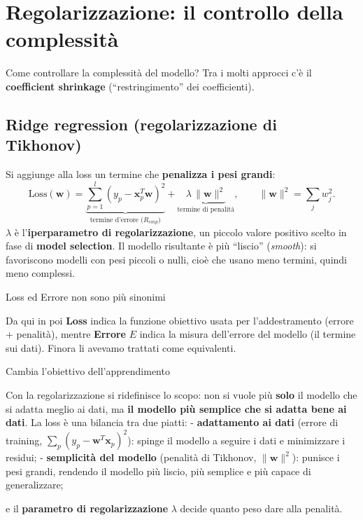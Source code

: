 \section{Regolarizzazione: il controllo della
complessità}\label{regolarizzazione-il-controllo-della-complessituxe0}

Come controllare la complessità del modello? Tra i molti approcci c'è il
\textbf{coefficient shrinkage} (``restringimento'' dei coefficienti).

\subsection{Ridge regression (regolarizzazione di
Tikhonov)}\label{ridge-regression-regolarizzazione-di-tikhonov}

Si aggiunge alla loss un termine che \textbf{penalizza i pesi grandi}:
\[
\text{Loss}(\mathbf{w}) = \underbrace{\sum_{p=1}^{l}(y_p - \mathbf{x}_p^T\mathbf{w})^2}_{\text{termine d'errore (} R_{emp}\text{)}} + \underbrace{\lambda\,\|\mathbf{w}\|^2}_{\text{termine di penalità}}, \qquad \|\mathbf{w}\|^2 = \sum_j w_j^2.
\] \(\lambda\) è l'\textbf{iperparametro di regolarizzazione}, un
piccolo valore positivo scelto in fase di \textbf{model selection}. Il
modello risultante è più ``liscio'' (\emph{smooth}): si favoriscono
modelli con pesi piccoli o nulli, cioè che usano meno termini, quindi
meno complessi.

\begin{boxnote}{Loss ed Errore non sono più sinonimi}

Da qui in poi \textbf{Loss} indica la funzione obiettivo usata per
l'addestramento (errore + penalità), mentre \textbf{Errore} \(E\) indica
la misura dell'errore del modello (il termine sui dati). Finora li
avevamo trattati come equivalenti.

\end{boxnote}

\begin{boxtip}{Cambia l'obiettivo dell'apprendimento}

Con la regolarizzazione si ridefinisce lo scopo: non si vuole più
\textbf{solo} il modello che si adatta meglio ai dati, ma \textbf{il
modello più semplice che si adatta bene ai dati}. La loss è una bilancia
tra due piatti: - \textbf{adattamento ai dati} (errore di training,
\(\sum_p(y_p - \mathbf{w}^T\mathbf{x}_p)^2\)): spinge il modello a
seguire i dati e minimizzare i residui; - \textbf{semplicità del
modello} (penalità di Tikhonov, \(\|\mathbf{w}\|^2\)): punisce i pesi
grandi, rendendo il modello più liscio, più semplice e più capace di
generalizzare;

e il \textbf{parametro di regolarizzazione} \(\lambda\) decide quanto
peso dare alla penalità.

\end{boxtip}

